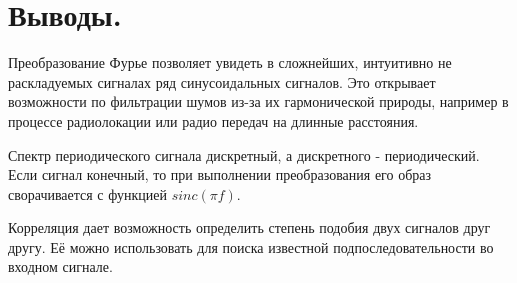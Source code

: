 \documentclass[a4paper,14pt]{extarticle}
\begin{document}
\section{Выводы.}

Преобразование Фурье позволяет увидеть в сложнейших, интуитивно не раскладуемых сигналах ряд синусоидальных сигналов. Это открывает возможности по фильтрации шумов из-за их гармонической природы, например в процессе радиолокации или радио передач на длинные расстояния.

Спектр периодического сигнала дискретный, а дискретного - периодический. Если сигнал конечный, то при выполнении преобразования его образ сворачивается с функцией $sinc(\pi f)$. 

Корреляция дает возможность определить степень подобия двух сигналов друг другу. Её можно использовать для поиска известной подпоследовательности во входном сигнале.
\end{document}
